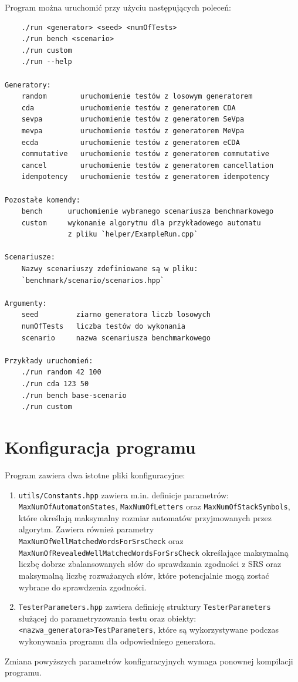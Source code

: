 \clearpage
Program można uruchomić przy użyciu następujących poleceń:
\begin{verbatim}
    ./run <generator> <seed> <numOfTests>
    ./run bench <scenario>
    ./run custom
    ./run --help
    
Generatory:
    random        uruchomienie testów z losowym generatorem
    cda           uruchomienie testów z generatorem CDA
    sevpa         uruchomienie testów z generatorem SeVpa
    mevpa         uruchomienie testów z generatorem MeVpa
    ecda          uruchomienie testów z generatorem eCDA
    commutative   uruchomienie testów z generatorem commutative
    cancel        uruchomienie testów z generatorem cancellation
    idempotency   uruchomienie testów z generatorem idempotency
    
Pozostałe komendy:
    bench      uruchomienie wybranego scenariusza benchmarkowego
    custom     wykonanie algorytmu dla przykładowego automatu
               z pliku `helper/ExampleRun.cpp`

Scenariusze:
    Nazwy scenariuszy zdefiniowane są w pliku:
    `benchmark/scenario/scenarios.hpp`

Argumenty:
    seed         ziarno generatora liczb losowych
    numOfTests   liczba testów do wykonania
    scenario     nazwa scenariusza benchmarkowego

Przykłady uruchomień:
    ./run random 42 100
    ./run cda 123 50
    ./run bench base-scenario
    ./run custom
\end{verbatim}

\clearpage
\section{Konfiguracja programu}

Program zawiera dwa istotne pliki konfiguracyjne:
\begin{enumerate}
    \item \texttt{utils/Constants.hpp} zawiera m.in. definicje parametrów: \texttt{MaxNumOf\-Automa\-ton\-States}, \texttt{MaxNumOfLetters}
    oraz \texttt{MaxNumOfStackSymbols}, które określają maksymalny rozmiar automatów przyjmowanych przez algorytm. 
    Zawiera również parametry \texttt{MaxNumOfWellMatchedWordsForSrsCheck} oraz \texttt{MaxNumOf\-Rev\-ealed\-Well\-MatchedWordsForSrsCheck} określające maksymalną liczbę dobrze zbalansowanych słów do sprawdzania
    zgodności z SRS oraz maksymalną liczbę rozważanych słów, które potencjalnie mogą zostać wybrane do sprawdzenia zgodności.

    \item \texttt{TesterParameters.hpp} zawiera definicję struktury \texttt{TesterParameters} służącej do parametryzowania testu oraz obiekty:
    \texttt{<nazwa\_generatora>Test\-Param\-eters}, które są wykorzystywane podczas wykonywania programu dla odpowiedniego generatora.
\end{enumerate}

Zmiana powyższych parametrów konfiguracyjnych wymaga ponownej kompilacji programu.